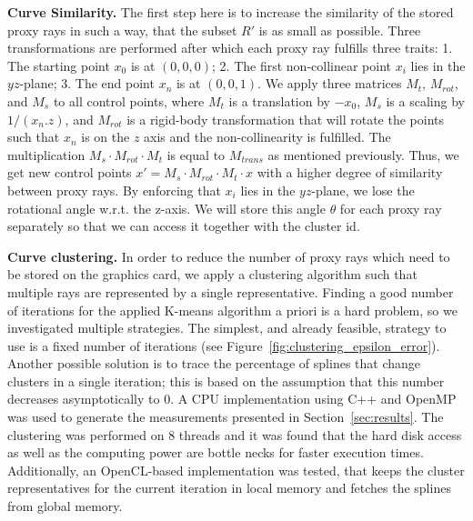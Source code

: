 \documentclass[journal]{vgtc}                %
\begin{document}
\noindent \textbf{Curve Similarity.} The first step here is to increase the similarity of the stored proxy rays in such a way, that the subset $R'$ is as small as possible. Three transformations are performed after which each proxy ray fulfills three traits: 1. The starting point  $x_0$ is at $(0,0,0)$; 2. The first non-collinear point $x_i$ lies in the $yz$-plane; 3. The end point $x_n$ is at $(0,0,1)$. We apply three matrices $M_t$, $M_{rot}$, and $M_s$ to all control points, where $M_t$ is a translation by $-x_0$, $M_s$ is a scaling by $1 / (x_n.z)$, and $M_{rot}$ is a rigid-body transformation that will rotate the points such that $x_n$ is on the $z$ axis and the non-collinearity is fulfilled. The multiplication $M_s \cdot M_{rot} \cdot M_t$ is equal to $M_{trans}$ as mentioned previously. Thus, we get new control points $x' = M_s \cdot M_{rot} \cdot M_t \cdot x$ with a higher degree of similarity between proxy rays. By enforcing that $x_i$ lies in the $yz$-plane, we lose the rotational angle w.r.t. the z-axis. We will store this angle $\theta$ for each proxy ray separately so that we can access it together with the cluster id.

\noindent \textbf{Curve clustering.} In order to reduce the number of proxy rays which need to be stored on the graphics card, we apply a clustering algorithm such that multiple rays are represented by a single representative. Finding a good number of iterations for the applied K-means algorithm a priori is a hard problem, so we investigated multiple strategies. The simplest, and already feasible, strategy to use is a fixed number of iterations (see Figure~\ref{fig:clustering_epsilon_error}). Another possible solution is to trace the percentage of splines that change clusters in a single iteration; this is based on the assumption that this number decreases asymptotically to 0. A CPU implementation using C++ and OpenMP was used to generate the measurements presented in Section~\ref{sec:results}. The clustering was performed on 8 threads and it was found that the hard disk access as well as the computing power are bottle necks for faster execution times. Additionally, an OpenCL-based implementation was tested, that keeps the cluster representatives for the current iteration in local memory and fetches the splines from global memory.
\end{document}
